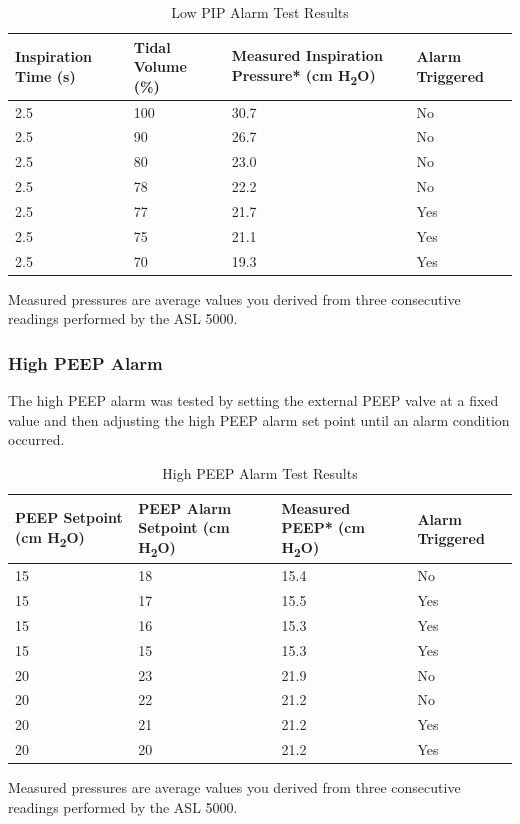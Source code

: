 \documentclass[]{article}
\begin{document}
\begin{center}
	\begin{table}[h]
		\caption{Low PIP Alarm Test Results}
		\label{tab:low_pip_test}
		\begin{tabular}{ |p{3.7cm}|p{3.3cm}|p{4cm}| p{2.9cm}|}
			
			\hline
			\textbf{Inspiration Time (s)} & \textbf{Tidal Volume (\%)} & \textbf{Measured Inspiration Pressure* (cm H\textsubscript{2}O)} & \textbf{Alarm Triggered}  \\ \hline
			2.5 & 100 & 30.7 & No\\ \hline
			2.5 & 90 & 26.7 & No\\ \hline
			2.5 & 80 & 23.0 & No\\ \hline
			2.5 & 78 & 22.2 & No\\ \hline
			2.5 & 77 & 21.7 & Yes\\ \hline
			2.5 & 75 & 21.1 & Yes\\ \hline
			2.5 & 70 & 19.3 & Yes\\ \hline
		\end{tabular}

	\noindent *Measured pressures are average values you derived from three consecutive readings performed by the ASL 5000.
	\end{table}	
\end{center}

\subsubsection{High PEEP Alarm}

The high PEEP alarm was tested by setting the external PEEP valve at a fixed value and then adjusting the high PEEP alarm set point until an alarm condition occurred.

\begin{center}
	\begin{table}[h]
		\caption{High PEEP Alarm Test Results}
		\label{tab:high_peep_test}
		\begin{tabular}{ |p{3.7cm}|p{3.3cm}|p{4cm}| p{2.9cm}|}
			
			\hline
			\textbf{PEEP Setpoint (cm H\textsubscript{2}O)} & \textbf{PEEP Alarm Setpoint (cm H\textsubscript{2}O)} & \textbf{Measured PEEP* (cm H\textsubscript{2}O)} & \textbf{Alarm Triggered}  \\ \hline
			15 & 18 & 15.4 & No\\ \hline
			15 & 17 & 15.5& Yes\\ \hline
			15 & 16 & 15.3 & Yes\\ \hline
			15 & 15 & 15.3 & Yes\\ \hline
			20 & 23 & 21.9 & No\\ \hline
			20 & 22 & 21.2 & No\\ \hline
			20 & 21 & 21.2 & Yes\\ \hline
			20 & 20 & 21.2 & Yes\\ \hline
		\end{tabular}

		\noindent *Measured pressures are average values you derived from three consecutive readings performed by the ASL 5000.
	\end{table}	
\end{center}
\end{document}

